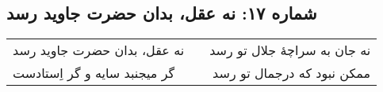 \begin{center}
\section*{شماره ۱۷: نه عقل، بدان حضرت جاوید رسد}
\label{sec:017}
\begin{longtable}{l p{0.5cm} r}
نه عقل، بدان حضرت جاوید رسد
&&
نه جان به سراچهٔ جلال تو رسد
\\
گر میجنبد سایه و گر اِستادست
&&
ممکن نبود که درجمال تو رسد
\\
\end{longtable}
\end{center}
